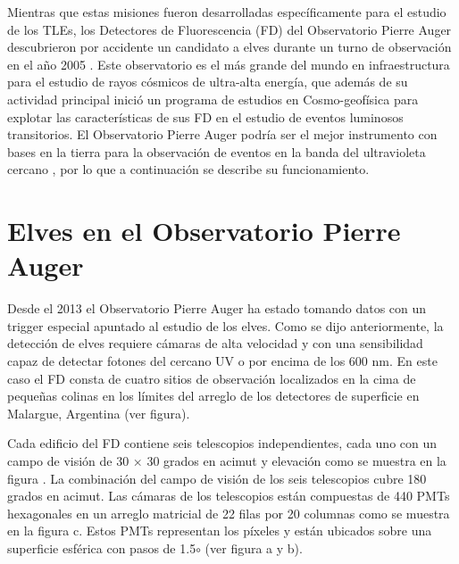 \documentclass[12pt,oneside,openany,letter]{book}
\begin{document}
Mientras que estas misiones fueron desarrolladas específicamente para el estudio de los TLEs, los Detectores de Fluorescencia (FD) del Observatorio Pierre Auger descubrieron por accidente un candidato a elves durante un turno de observación en el año 2005 \cite{Mussa2019}. Este observatorio es el más grande del mundo en infraestructura para el estudio de rayos cósmicos de ultra-alta energía, que además de su actividad principal inició un programa de estudios en Cosmo-geofísica para explotar las características de sus FD en el estudio de eventos luminosos transitorios. El Observatorio Pierre Auger podría ser el mejor instrumento con bases en la tierra para la observación de eventos en la banda del ultravioleta cercano \cite{MussaCiaccio2012}, por lo que a continuación se describe su funcionamiento.  

\section{Elves en el Observatorio Pierre Auger}
Desde el 2013 el Observatorio Pierre Auger ha estado tomando datos con un trigger especial apuntado al estudio de los elves. Como se dijo anteriormente, la detecci\'on de elves requiere c\'amaras de alta velocidad y con una sensibilidad capaz de detectar fotones del cercano UV o por encima de los 600 nm. En este caso el FD consta de cuatro sitios de observaci\'on localizados en la cima de pequeñas colinas en los límites del arreglo de los detectores de superficie en Malargue, Argentina (ver figura). 

Cada edificio del FD contiene seis telescopios independientes, cada uno con un campo de visión de 30 × 30 grados en acimut y elevación como se muestra en la figura . La combinación del campo de visión de los seis telescopios cubre 180 grados en acimut. Las c\'amaras de los telescopios est\'an compuestas de 440 PMTs hexagonales en un arreglo matricial de 22 filas por 20 columnas como se muestra en la figura c. Estos PMTs representan los p\'ixeles y est\'an ubicados sobre una superficie esf\'erica con pasos de 1.5$\circ$ (ver figura a y b). 
\end{document}
